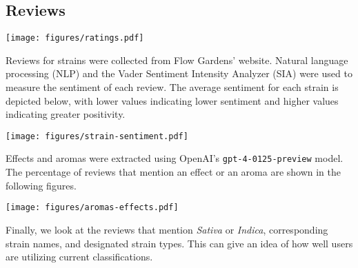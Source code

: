 \documentclass[../article.tex, 12pt]{subfiles}
\begin{document}
\newpage
\begin{multicols}{2}

\section*{Reviews}
\label{sec:Reviews}
\thispagestyle{regular}

\texttt{[image: figures/ratings.pdf]}

\vspace{1\baselineskip}

Reviews for strains were collected from Flow Gardens' website. Natural language processing (NLP) and the Vader Sentiment Intensity Analyzer (SIA) were used to measure the sentiment of each review. The average sentiment for each strain is depicted below, with lower values indicating lower sentiment and higher values indicating greater positivity.

\vspace{1\baselineskip}

\texttt{[image: figures/strain-sentiment.pdf]}

Effects and aromas were extracted using OpenAI's \texttt{gpt-4-0125-preview} model. The percentage of reviews that mention an effect or an aroma are shown in the following figures.

\vspace{1\baselineskip}

\texttt{[image: figures/aromas-effects.pdf]}

\vspace{1\baselineskip}

Finally, we look at the reviews that mention {\itshape Sativa} or {\itshape Indica}, corresponding strain names, and designated strain types. This can give an idea of how well users are utilizing current classifications.

\vspace{0.5\baselineskip}

{\scriptsize

\vspace{1\baselineskip}



\vspace{1\baselineskip}


}



\end{multicols}
\end{document}
